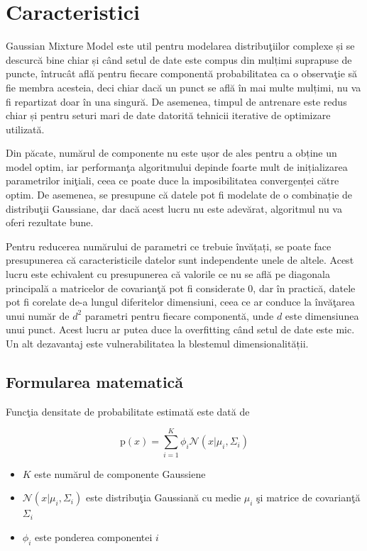 \section{Caracteristici}

Gaussian Mixture Model este util pentru modelarea distribuţiilor 
complexe și se descurcă bine chiar și când setul de date 
este compus din mulțimi suprapuse de puncte, întrucât află 
pentru fiecare componentă probabilitatea ca o observaţie
să fie membra acesteia, deci chiar dacă un punct se află 
în mai multe mulțimi, nu va fi repartizat doar în una singură.
De asemenea, timpul de antrenare este redus chiar și pentru 
seturi mari de date datorită tehnicii iterative de optimizare 
utilizată.

Din păcate, numărul de componente nu este ușor de ales 
pentru a obține un model optim, iar performanţa algoritmului 
depinde foarte mult de inițializarea parametrilor iniţiali, 
ceea ce poate duce la imposibilitatea convergenței către optim.
De asemenea, se presupune că datele pot fi modelate de o 
combinație de distribuţii Gaussiane, dar dacă acest lucru 
nu este adevărat, algoritmul nu va oferi rezultate bune.

Pentru reducerea numărului de parametri ce trebuie învățați,
se poate face presupunerea că caracteristicile datelor 
sunt independente unele de altele. Acest lucru este 
echivalent cu presupunerea că valorile ce nu se află 
pe diagonala principală a matricelor de covarianţă
pot fi considerate 0, dar în practică, datele pot 
fi corelate de-a lungul diferitelor dimensiuni, ceea 
ce ar conduce la învăţarea unui număr de $d^2$ parametri 
pentru fiecare componentă, unde $d$ este dimensiunea unui punct.
Acest lucru ar putea duce la overfitting când setul de date 
este mic\cite{aggarwal2017outlier}.
Un alt dezavantaj este vulnerabilitatea la blestemul 
dimensionalității.

\subsection{Formularea matematică}

Funcţia densitate de probabilitate estimată este dată de

\begin{equation}
    \text{p}(x) = \sum_{i=1}^{K} \phi_i \mathcal{N}(x|\mu_i, \Sigma_i)
\end{equation}

\begin{itemize}
    \item $K$ este numărul de componente Gaussiene
    \item $\mathcal{N}(x | \mu_i, \Sigma_i)$ este distribuţia Gaussiană
    cu medie $\mu_i$ şi matrice de covarianţă $\Sigma_i$
    \item $\phi_i$ este ponderea componentei $i$
\end{itemize}

